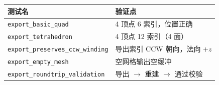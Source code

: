 \documentclass[11pt,a4paper]{article}
\begin{document}
\begin{center}
\renewcommand{\arraystretch}{1.18}
\begin{tabular}{@{}ll@{}}
  \toprule
  \textbf{测试名} & \textbf{验证点} \\
  \midrule
  \texttt{export\_basic\_quad}             & 4 顶点 6 索引，位置正确 \\
  \texttt{export\_tetrahedron}             & 4 顶点 12 索引（4 面） \\
  \texttt{export\_preserves\_ccw\_winding} & 导出索引 CCW 朝向，法向 $+z$ \\
  \texttt{export\_empty\_mesh}             & 空网格输出空缓冲 \\
  \texttt{export\_roundtrip\_validation}   & 导出 $\to$ 重建 $\to$ 通过校验 \\
  \bottomrule
\end{tabular}
\end{center}
\end{document}
